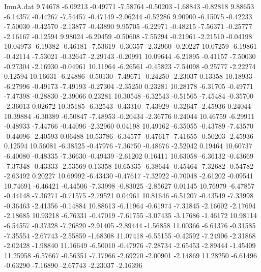 \begin{filecontents}{ImuA.dat}
   9.74678   -6.09213   -0.49771   -7.58764   -0.50203   -1.68843   -0.82818
   9.88653   -6.14357   -0.44267   -7.54457   -0.47149   -2.06244   -0.52286
   9.90900   -6.15075   -0.42233   -7.50030   -0.42570   -2.13877   -0.43890
   9.95705   -6.22971   -0.48215   -7.56371   -0.25777   -2.16167   -0.12594
   9.98024   -6.20459   -0.50608   -7.55294   -0.21961   -2.21510   -0.04198
  10.04973   -6.19382   -0.46181   -7.53619   -0.30357   -2.32960   -0.20227
  10.07259   -6.19861   -0.42114   -7.53021   -0.32647   -2.29143   -0.20991
  10.09644   -6.21895   -0.41157   -7.50030   -0.27304   -2.16930   -0.04961
  10.11964   -6.26561   -0.45823   -7.54098   -0.25777   -2.22274    0.12594
  10.16631   -6.24886   -0.50130   -7.49671   -0.24250   -2.23037    0.13358
  10.18933   -6.27996   -0.49173   -7.49193   -0.27304   -2.35250    0.23281
  10.28178   -6.31705   -0.49771   -7.47398   -0.28830   -2.39066    0.23281
  10.30548   -6.32543   -0.51565   -7.45484   -0.35700   -2.36013    0.02672
  10.35185   -6.32543   -0.43310   -7.43929   -0.32647   -2.45936    0.24044
  10.39884   -6.30389   -0.50847   -7.48953   -0.20434   -2.36776    0.24044
  10.46759   -6.29911   -0.48933   -7.44766   -0.44096   -2.32960    0.04198
  10.49162   -6.35055   -0.43789   -7.43570   -0.44096   -2.40593    0.06488
  10.53786   -6.34577   -0.47617   -7.41655   -0.50203   -2.45936    0.12594
  10.56081   -6.38525   -0.47976   -7.36750   -0.48676   -2.52042    0.19464
  10.60737   -6.40080   -0.48335   -7.36630   -0.49439   -2.61202    0.16411
  10.63058   -6.36132   -0.43669   -7.37348   -0.43333   -2.53569    0.13358
  10.65335   -6.38644   -0.45464   -7.32682   -0.54782   -2.63492    0.20227
  10.69992   -6.43430   -0.47617   -7.32922   -0.70048   -2.61202   -0.09541
  10.74691   -6.46421   -0.44506   -7.33998   -0.83025   -2.85627    0.01145
  10.76979   -6.47857   -0.44148   -7.36271   -0.71575   -2.79521    0.04961
  10.81646   -6.51207   -0.43549   -7.33998   -0.36463   -2.41356   -0.14884
  10.88613   -6.11964   -0.61974   -7.31845   -2.16602   -2.17694   -2.18685
  10.93218   -6.76331   -0.47019   -7.61755   -3.07435   -3.17686   -1.46172
  10.98114   -6.54557   -0.37328   -7.26820   -2.91405   -2.89444   -1.56858
  11.00366   -6.61376   -0.31585   -7.35554   -2.67743   -2.55859   -1.68308
  11.07418   -6.55155   -0.42592   -7.24906   -2.31868   -2.02428   -1.98840
  11.16649   -6.50010   -0.47976   -7.28734   -2.65453   -2.89444   -1.45409
  11.25958   -6.57667   -0.56351   -7.17966   -2.69270   -2.00901   -2.14869
  11.28250   -6.61496   -0.63290   -7.16890   -2.67743   -2.23037   -2.16396

\end{filecontents}
